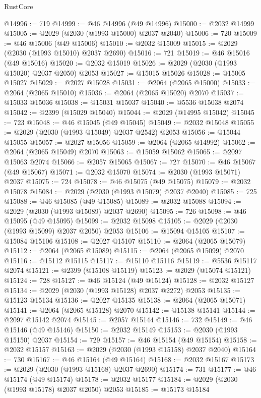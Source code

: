 \begin{lexlean}{RustCore}
\begin{coremodule}
@14996 := 719
@14999 := @46 @14996 (@49 @14996)
@15000 := @2032 @14999
@15005 := @2029 (@2030 (@1993 @15000) @2037 @2040)
@15006 := 720
@15009 := @46 @15006 (@49 @15006)
@15010 := @2032 @15009
@15015 := @2029 (@2030 (@1993 @15010) @2037 @2690)
@15016 := 721
@15019 := @46 @15016 (@49 @15016)
@15020 := @2032 @15019
@15026 := @2029 (@2030 (@1993 @15020) @2037 @2050) @2053
@15027 := @15015 @15026
@15028 := @15005 @15027
@15029 := @2027 @15028
@15031 := @2064 (@2065 @15000)
@15033 := @2064 (@2065 @15010)
@15036 := @2064 (@2065 @15020) @2070
@15037 := @15033 @15036
@15038 := @15031 @15037
@15040 := @5536 @15038 @2074
@15042 := @2399 (@15029 @15040)
@15044 := @2029 (@14995 @15042)
@15045 := 723
@15048 := @46 @15045 (@49 @15045)
@15049 := @2032 @15048
@15055 := @2029 (@2030 (@1993 @15049) @2037 @2542) @2053
@15056 := @15044 @15055
@15057 := @2027 @15056
@15059 := @2064 (@2065 @14992)
@15062 := @2064 (@2065 @15049) @2070
@15063 := @15059 @15062
@15065 := @2097 @15063 @2074
@15066 := @2057 @15065
@15067 := 727
@15070 := @46 @15067 (@49 @15067)
@15071 := @2032 @15070
@15074 := @2030 (@1993 @15071) @2037
@15075 := 724
@15078 := @46 @15075 (@49 @15075)
@15079 := @2032 @15078
@15084 := @2029 (@2030 (@1993 @15079) @2037 @2040)
@15085 := 725
@15088 := @46 @15085 (@49 @15085)
@15089 := @2032 @15088
@15094 := @2029 (@2030 (@1993 @15089) @2037 @2690)
@15095 := 726
@15098 := @46 @15095 (@49 @15095)
@15099 := @2032 @15098
@15105 := @2029 (@2030 (@1993 @15099) @2037 @2050) @2053
@15106 := @15094 @15105
@15107 := @15084 @15106
@15108 := @2027 @15107
@15110 := @2064 (@2065 @15079)
@15112 := @2064 (@2065 @15089)
@15115 := @2064 (@2065 @15099) @2070
@15116 := @15112 @15115
@15117 := @15110 @15116
@15119 := @5536 @15117 @2074
@15121 := @2399 (@15108 @15119)
@15123 := @2029 (@15074 @15121)
@15124 := 728
@15127 := @46 @15124 (@49 @15124)
@15128 := @2032 @15127
@15134 := @2029 (@2030 (@1993 @15128) @2037 @2272) @2053
@15135 := @15123 @15134
@15136 := @2027 @15135
@15138 := @2064 (@2065 @15071)
@15141 := @2064 (@2065 @15128) @2070
@15142 := @15138 @15141
@15144 := @2097 @15142 @2074
@15145 := @2057 @15144
@15146 := 732
@15149 := @46 @15146 (@49 @15146)
@15150 := @2032 @15149
@15153 := @2030 (@1993 @15150) @2037
@15154 := 729
@15157 := @46 @15154 (@49 @15154)
@15158 := @2032 @15157
@15163 := @2029 (@2030 (@1993 @15158) @2037 @2040)
@15164 := 730
@15167 := @46 @15164 (@49 @15164)
@15168 := @2032 @15167
@15173 := @2029 (@2030 (@1993 @15168) @2037 @2690)
@15174 := 731
@15177 := @46 @15174 (@49 @15174)
@15178 := @2032 @15177
@15184 := @2029 (@2030 (@1993 @15178) @2037 @2050) @2053
@15185 := @15173 @15184

\end{coremodule}
\end{lexlean}
